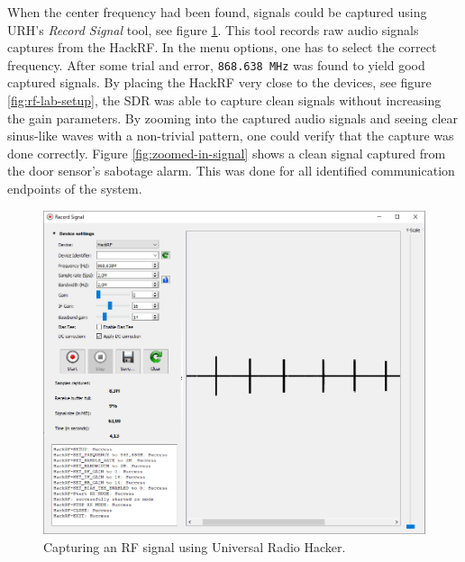 When the center frequency had been found, signals could be captured using URH's \textit{Record Signal} tool, see figure \ref{fig:rf-signal-capture}. This tool records raw audio signals captures from the HackRF. In the menu options, one has to select the correct frequency. After some trial and error, \texttt{868.638 MHz} was found to yield good captured signals. By placing the HackRF very close to the devices, see figure \ref{fig:rf-lab-setup}, the SDR was able to capture clean signals without increasing the gain parameters. By zooming into the captured audio signals and seeing clear sinus-like waves with a non-trivial pattern, one could verify that the capture was done correctly. Figure \ref{fig:zoomed-in-signal} shows a clean signal captured from the door sensor's sabotage alarm. This was done for all identified communication endpoints of the system.
\begin{figure}[!ht]
    \centering
    \includegraphics[width=\textwidth]{images/6-pentesting/signal-capture.png}
    \caption{Capturing an RF signal using Universal Radio Hacker.}
    \label{fig:rf-signal-capture}
\end{figure}
